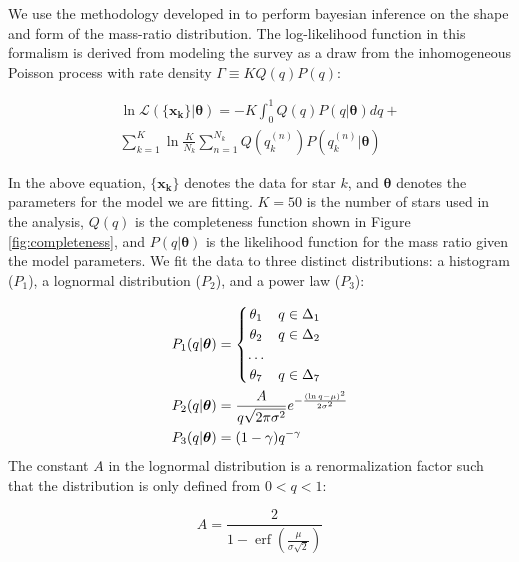 \documentclass{emulateapj}
\renewcommand{\vec}[1]{\bm{#1}}
\DeclareMathOperator\erf{erf}
\begin{document}
We use the methodology developed in \citet{Foreman2014} to perform bayesian inference on the shape and form of the mass-ratio distribution. The log-likelihood function in this formalism is derived from modeling the survey as a draw from the inhomogeneous Poisson process with rate density $\Gamma \equiv KQ(q)P(q)$:

\begin{multline}
\ln{\mathcal{L}(\{\vec{x_k}\}| \vec{\theta})} = -K \int_0^1 Q(q)P(q|\vec{\theta})dq + \\ \sum_{k=1}^K \ln{\frac{K}{N_k} \sum_{n=1}^{N_k} Q(q_k^{(n)}) P(q_k^{(n)}|\vec{\theta})}
\label{eqn:money}
\end{multline}

In the above equation, $\{\vec{x_k}\}$ denotes the data for star $k$, and $\vec{\theta}$ denotes the parameters for the model we are fitting. $K=50$ is the number of stars used in the analysis, $Q(q)$ is the completeness function shown in Figure \ref{fig:completeness}, and $P(q|\vec{\theta})$ is the likelihood function for the mass ratio given the model parameters. We fit the data to three distinct distributions: a histogram ($P_1$), a lognormal distribution ($P_2$), and a power law ($P_3$):

\begin{align}
 P_1(q|\vec{\theta}) &= \begin{cases}
      \hfill \theta_1 \hfill & q \in \Delta_1 \\
      \hfill \theta_2 \hfill & q \in \Delta_2 \\
      \hfill \ldots \\
      \hfill \theta_7 \hfill & q \in \Delta_7
     \end{cases} \label{eqn:P1} \\
 P_2(q|\vec{\theta}) &= \frac{A}{q\sqrt{2\pi\sigma^2}} e^{-\frac{(\ln{q} - \mu)^2}{2\sigma^2}} \label{eqn:P2} \\
 P_3(q|\vec{\theta}) &= (1-\gamma)q^{-\gamma} \label{eqn:P3}
\end{align}
The constant $A$ in the lognormal distribution is a renormalization factor such that the distribution is only defined from $0 < q < 1$:

\begin{equation}
A = \frac{2}{1-\erf\left(\frac{\mu}{\sigma \sqrt{2}}\right)}
\end{equation}
\end{document}
